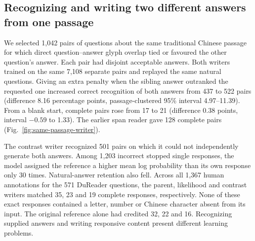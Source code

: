\subsection*{Recognizing and writing two different answers from one passage}
We selected 1,042 pairs of questions about the same traditional Chinese passage for which direct question--answer glyph overlap tied or favoured the other question's answer. Each pair had disjoint acceptable answers. Both writers trained on the same 7,108 separate pairs and replayed the same natural questions. Giving an extra penalty when the sibling answer outranked the requested one increased correct recognition of both answers from 437 to 522 pairs (difference 8.16 percentage points, passage-clustered 95\% interval 4.97--11.39). From a blank start, complete pairs rose from 17 to 21 (difference 0.38 points, interval $-0.59$ to 1.33). The earlier span reader gave 128 complete pairs (Fig.~\ref{fig:same-passage-writer}).

The contrast writer recognized 501 pairs on which it could not independently generate both answers. Among 1,203 incorrect stopped single responses, the model assigned the reference a higher mean log probability than its own response only 30 times. Natural-answer retention also fell. Across all 1,367 human annotations for the 571 DuReader questions, the parent, likelihood and contrast writers matched 35, 23 and 19 complete responses, respectively. None of these exact responses contained a letter, number or Chinese character absent from its input. The original reference alone had credited 32, 22 and 16. Recognizing supplied answers and writing responsive content present different learning problems.
